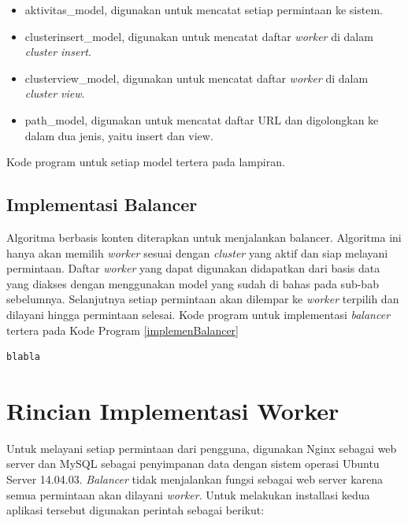 \documentclass{ta-its}
\begin{document}
		        \begin{itemize}
		        	\item aktivitas\_model, digunakan untuk mencatat setiap permintaan ke sistem.
		        	\item clusterinsert\_model, digunakan untuk mencatat daftar \textit{worker} di dalam \textit{cluster insert}.
		        	\item clusterview\_model, digunakan untuk mencatat daftar \textit{worker} di dalam \textit{cluster view}.
		        	\item path\_model, digunakan untuk mencatat daftar URL dan digolongkan ke dalam dua jenis, yaitu insert dan view.
		        \end{itemize}
		        
		        Kode program untuk setiap model tertera pada lampiran.
			
			\subsection{Implementasi Balancer}
				Algoritma berbasis konten diterapkan untuk menjalankan balancer. Algoritma ini hanya akan memilih \textit{worker} sesuai dengan \textit{cluster} yang aktif dan siap melayani permintaan. Daftar \textit{worker} yang dapat digunakan didapatkan dari basis data yang diakses dengan menggunakan model yang sudah di bahas pada sub-bab sebelumnya. Selanjutnya setiap permintaan akan dilempar ke \textit{worker} terpilih dan dilayani hingga permintaan selesai. Kode program untuk implementasi \textit{balancer} tertera pada Kode Program \ref{implemenBalancer}
				
				\begin{lstlisting}[frame=single,tabsize=2,breaklines,caption={Implementasi Algoritma Berbasis Konten pada Balancer},label=implemenBalancer]
blabla
				\end{lstlisting}
		
		\section{Rincian Implementasi Worker}
			Untuk melayani setiap permintaan dari pengguna, digunakan Nginx sebagai web server dan MySQL sebagai penyimpanan data dengan sistem operasi Ubuntu Server 14.04.03. \textit{Balancer} tidak menjalankan fungsi sebagai web server karena semua permintaan akan dilayani \textit{worker}. Untuk melakukan installasi kedua aplikasi tersebut digunakan perintah sebagai berikut:
			
\end{document}
